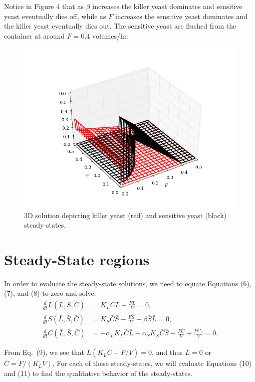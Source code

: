Notice in Figure 4 that as $\beta$ increases the killer yeast dominates and sensitive yeast eventually dies off, while as $F$ increases the sensitive yeast dominates and the killer yeast eventually dies out.  The sensitive yeast are flushed from the container at around $F = 0.4$ volumes/hr.

\begin{figure}[H]
  \centering
    \includegraphics[width=1.0\textwidth]{images/3d.png}
  \caption{\footnotesize 3D solution depicting killer yeast (red) and sensitive yeast (black) steady-states.}
\end{figure}

\section*{Steady-State regions}

In order to evaluate the steady-state solutions, we need to equate Equations (6), (7), and (8) to zero and solve:
\begin{align}
  \frac{d}{dt}L(\bar{L}, \bar{S}, \bar{C}) &= K_L \bar{C}\bar{L} - \frac{F\bar{L}}{V} = 0, \\
  \frac{d}{dt}S(\bar{L}, \bar{S}, \bar{C}) &= K_S \bar{C}\bar{S} - \frac{F\bar{S}}{V} - \beta \bar{S} \bar{L} = 0, \\
  \frac{d}{dt}C(\bar{L}, \bar{S}, \bar{C}) &= -\alpha_L K_L \bar{C}\bar{L} -\alpha_S K_S \bar{C}\bar{S} - \frac{F\bar{C}}{V} + \frac{FC_0}{V} = 0.
\end{align}

From Eq.\ (9), we see that $\bar{L}(K_L \bar{C} - F/V) = 0$, and thus $\bar{L} = 0$ or $\bar{C} = F/(K_L V)$.  For each of these steady-states, we will evaluate Equations (10) and (11) to find the qualitative behavior of the steady-states.

